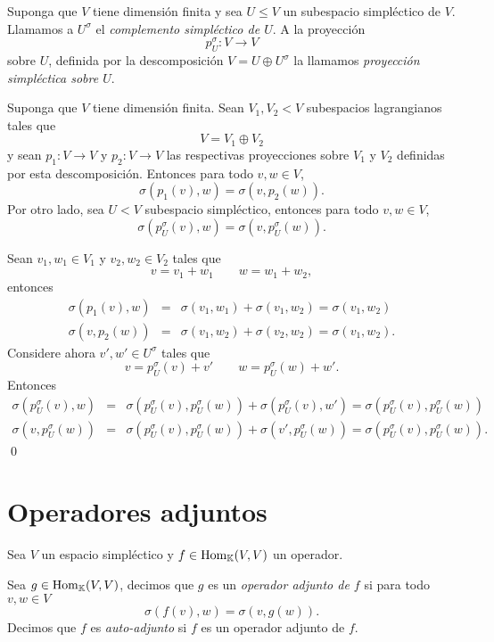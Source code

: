 \begin{defn}
Suponga que $V$ tiene dimensi\'on finita y sea $U\le V$ un subespacio simpl\'ectico de $V$. Llamamos a $U^\sigma$ el \emph{complemento simpl\'ectico de $U$}. A la proyecci\'on
\[
p_U^\sigma: V\longrightarrow V
\]
sobre $U$, definida por la descomposici\'on $V=U\oplus U^\sigma$ la llamamos \emph{proyecci\'on simpl\'ectica sobre $U$}.
\end{defn}

\begin{pro}
Suponga que $V$ tiene dimensi\'on finita. Sean $V_1,V_2<V$ subespacios lagrangianos tales que
\[
V=V_1\oplus V_2
\]
y sean $p_1:V\rightarrow V$ y $p_2: V\rightarrow V$ las respectivas proyecciones sobre $V_1$ y $V_2$ definidas por esta descomposici\'on. Entonces para todo $v,w\in V$,
\[
\sigma\left(p_1(v),w\right)=\sigma\left(v,p_2(w)\right).
\]
Por otro lado, sea $U<V$ subespacio simpl\'ectico, entonces para todo $v,w\in V$,
\[
\sigma\left(p_U^\sigma(v),w\right)=\sigma\left(v,p_U^\sigma(w)\right).
\]
\end{pro}

\dem Sean $v_1,w_1\in V_1$ y $v_2,w_2\in V_2$ tales que
\[
v=v_1+w_1\qquad w=w_1+w_2,
\]
entonces
\begin{eqnarray*}
\sigma\left(p_1(v),w\right) & = & \sigma (v_1,w_1)+\sigma(v_1,w_2)=\sigma(v_1,w_2)\\
\sigma\left(v,p_2(w)\right) & = & \sigma(v_1,w_2)+\sigma(v_2,w_2)=
\sigma(v_1,w_2).
\end{eqnarray*}
Considere ahora $v',w'\in U^\sigma$ tales que
\[
v=p_U^\sigma(v)+v'\qquad w=p_U^\sigma(w)+w'.
\]
Entonces
\begin{eqnarray*}
\sigma\left(p_U^\sigma(v),w\right) & = & \sigma\left(p_U^\sigma(v),p_U^\sigma(w)\right)+\sigma\left(p_U^\sigma(v),w'\right)= \sigma\left(p_U^\sigma(v),p_U^\sigma(w)\right)\\
\sigma\left(v,p_U^\sigma(w)\right) & = & \sigma\left(p_U^\sigma(v),p_U^\sigma(w)\right)+\sigma\left(v',p_U^\sigma(w)\right)=\sigma\left(p_U^\sigma(v),p_U^\sigma(w)\right).
\end{eqnarray*}
\qed

\section{Operadores adjuntos}

Sea $V$ un espacio simpl\'ectico y $f\in\operatorname{Hom}_\mathbb{K}(V,V)$ un operador.

\begin{defn}
Sea $g\in\operatorname{Hom}_\mathbb{K}(V,V)$, decimos que $g$ es un \emph{operador adjunto de $f$} si para todo $v,w\in V$
\[
\sigma\left( f(v),w \right)=\sigma\left( v,g(w)\right).
\]
Decimos que $f$ es \emph{auto-adjunto} si $f$ es un operador adjunto de $f$. 
\end{defn}

